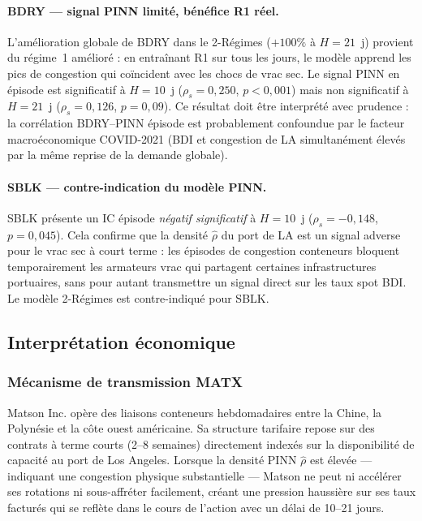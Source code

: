 \paragraph{BDRY — signal PINN limité, bénéfice R1 réel.}
L'amélioration globale de BDRY dans le 2-Régimes ($+100\%$ à $H = 21$~j)
provient du régime~1 amélioré : en entraînant R1 sur tous les jours,
le modèle apprend les pics de congestion qui coïncident avec les chocs de
vrac sec. Le signal PINN en épisode est significatif à $H = 10$~j
($\rho_s = 0{,}250$, $p < 0{,}001$) mais non significatif à $H = 21$~j
($\rho_s = 0{,}126$, $p = 0{,}09$). Ce résultat doit être interprété avec
prudence : la corrélation BDRY--PINN épisode est probablement confoundue
par le facteur macroéconomique COVID-2021 (BDI et congestion de LA
simultanément élevés par la même reprise de la demande globale).

\paragraph{SBLK — contre-indication du modèle PINN.}
SBLK présente un IC épisode \emph{négatif significatif} à $H = 10$~j
($\rho_s = -0{,}148$, $p = 0{,}045$). Cela confirme que la densité
$\hat{\rho}$ du port de LA est un signal adverse pour le vrac sec à
court terme : les épisodes de congestion conteneurs bloquent temporairement
les armateurs vrac qui partagent certaines infrastructures portuaires,
sans pour autant transmettre un signal direct sur les taux spot BDI.
Le modèle 2-Régimes est contre-indiqué pour SBLK.

\bigskip

\subsection{Interprétation économique}

\subsubsection{Mécanisme de transmission MATX}

Matson Inc. opère des liaisons conteneurs hebdomadaires entre la Chine, la
Polynésie et la côte ouest américaine. Sa structure tarifaire repose sur
des contrats à terme courts (2--8 semaines) directement indexés sur la
disponibilité de capacité au port de Los Angeles. Lorsque la densité
PINN $\hat{\rho}$ est élevée --- indiquant une congestion physique
substantielle --- Matson ne peut ni accélérer ses rotations ni sous-affréter
facilement, créant une pression haussière sur ses taux facturés qui se
reflète dans le cours de l'action avec un délai de 10--21 jours.

